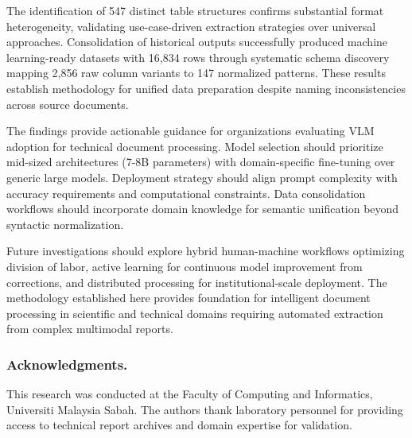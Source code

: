 \documentclass{svproc}
\begin{document}
The identification of 547 distinct table structures confirms substantial format heterogeneity, validating use-case-driven extraction strategies over universal approaches. Consolidation of historical outputs successfully produced machine learning-ready datasets with 16,834 rows through systematic schema discovery mapping 2,856 raw column variants to 147 normalized patterns. These results establish methodology for unified data preparation despite naming inconsistencies across source documents.

The findings provide actionable guidance for organizations evaluating VLM adoption for technical document processing. Model selection should prioritize mid-sized architectures (7-8B parameters) with domain-specific fine-tuning over generic large models. Deployment strategy should align prompt complexity with accuracy requirements and computational constraints. Data consolidation workflows should incorporate domain knowledge for semantic unification beyond syntactic normalization.

Future investigations should explore hybrid human-machine workflows optimizing division of labor, active learning for continuous model improvement from corrections, and distributed processing for institutional-scale deployment. The methodology established here provides foundation for intelligent document processing in scientific and technical domains requiring automated extraction from complex multimodal reports.

\subsubsection{Acknowledgments.}

This research was conducted at the Faculty of Computing and Informatics, Universiti Malaysia Sabah. The authors thank laboratory personnel for providing access to technical report archives and domain expertise for validation.
\end{document}
